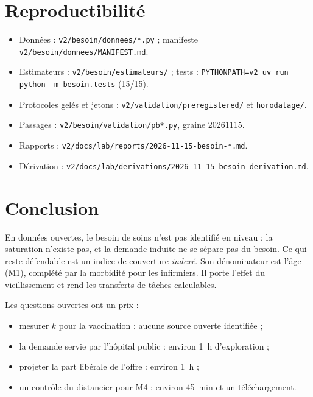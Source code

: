 \documentclass[11pt]{article}
\begin{document}
\section{Reproductibilité}
\begin{itemize}
  \item Données : \texttt{v2/besoin/donnees/*.py} ; manifeste \texttt{v2/besoin/donnees/MANIFEST.md}.
  \item Estimateurs : \texttt{v2/besoin/estimateurs/} ; tests : \texttt{PYTHONPATH=v2 uv run python -m besoin.tests}
        (15/15\mesure{}).
  \item Protocoles gelés et jetons : \texttt{v2/validation/preregistered/} et \texttt{horodatage/}.
  \item Passages : \texttt{v2/besoin/validation/pb*.py}, graine 20261115.
  \item Rapports : \texttt{v2/docs/lab/reports/2026-11-15-besoin-*.md}.
  \item Dérivation : \texttt{v2/docs/lab/derivations/2026-11-15-besoin-derivation.md}.
\end{itemize}

\section{Conclusion}
En données ouvertes, le besoin de soins n'est pas identifié en niveau : la saturation n'existe pas, et la demande
induite ne se sépare pas du besoin. Ce qui reste défendable est un indice de couverture \emph{indexé}. Son
dénominateur est l'âge (M1), complété par la morbidité pour les infirmiers. Il porte l'effet du vieillissement et
rend les transferts de tâches calculables.

Les questions ouvertes ont un prix :
\begin{itemize}
  \item mesurer $k$ pour la vaccination : aucune source ouverte identifiée ;
  \item la demande servie par l'hôpital public : environ 1~h d'exploration\suppose{} ;
  \item projeter la part libérale de l'offre : environ 1~h\suppose{} ;
  \item un contrôle du distancier pour M4 : environ 45~min et un téléchargement\suppose{}.
\end{itemize}



\end{document}
